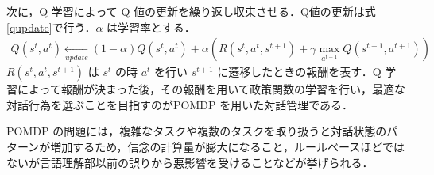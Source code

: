 次に，Q 学習によって Q 値の更新を繰り返し収束させる．Q値の更新は式\ref{qupdate}で行う．$\alpha$ は学習率とする．
\begin{eqnarray}
  \label{qupdate}
  Q\left(s^t,a^t\right) \xleftarrow[update]{} \left(1-\alpha\right)Q\left(s^t,a^t\right) + \alpha \left(R\left(s^t,a^t,s^{t+1}\right) + \gamma \max_{a^{t+1}}Q\left(s^{t+1},a^{t+1}\right)\right)
\end{eqnarray}
$R(s^t,a^t,s^{t+1})$ は $s^t$ の時 $a^t$ を行い $s^{t+1}$ に遷移したときの報酬を表す．Q 学習によって報酬が決まった後，その報酬を用いて政策関数の学習を行い，最適な対話行為を選ぶことを目指すのがPOMDP を用いた対話管理である．
\par
POMDP の問題には，複雑なタスクや複数のタスクを取り扱うと対話状態のパターンが増加するため，信念の計算量が膨大になること，ルールベースほどではないが言語理解部以前の誤りから悪影響を受けることなどが挙げられる．